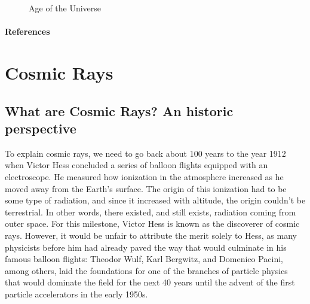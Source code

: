 \documentclass[
  letterpaper,
  DIV=11,
  numbers=noendperiod]{scrreprt}
\newlength{\cslhangindent}
\newenvironment{CSLReferences}[2] %
 {\begin{list}{}{%
  \setlength{\itemindent}{0pt}
  \setlength{\leftmargin}{0pt}
  \setlength{\parsep}{0pt}
  \ifodd #1
   \setlength{\leftmargin}{\cslhangindent}
   \setlength{\itemindent}{-1\cslhangindent}
  \fi
  \setlength{\itemsep}{#2\baselineskip}}}
 {\end{list}}
\begin{document}
\begin{figure}[H]


\caption{\label{fig-age}Age of the Universe}

\end{figure}%

\subsubsection*{References}\label{references}

\label{refs}
\begin{CSLReferences}{0}{1}
\end{CSLReferences}


\chapter*{Cosmic Rays}\label{cosmic-rays}


\section*{What are Cosmic Rays? An historic
perspective}\label{what-are-cosmic-rays-an-historic-perspective}


To explain cosmic rays, we need to go back about 100 years to the year
1912 when Victor Hess concluded a series of balloon flights equipped
with an electroscope. He measured how ionization in the atmosphere
increased as he moved away from the Earth's surface. The origin of this
ionization had to be some type of radiation, and since it increased with
altitude, the origin couldn't be terrestrial. In other words, there
existed, and still exists, radiation coming from outer space. For this
milestone, Victor Hess is known as the discoverer of cosmic rays.
However, it would be unfair to attribute the merit solely to Hess, as
many physicists before him had already paved the way that would
culminate in his famous balloon flights: Theodor Wulf, Karl Bergwitz,
and Domenico Pacini, among others, laid the foundations for one of the
branches of particle physics that would dominate the field for the next
40 years until the advent of the first particle accelerators in the
early 1950s.
\end{document}
